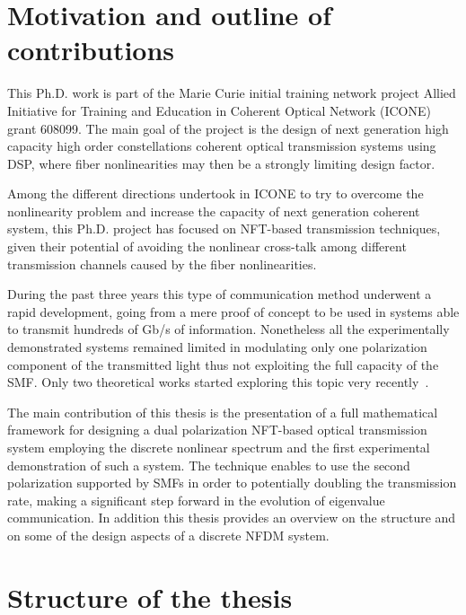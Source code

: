 \section{Motivation and outline of contributions}

This Ph.D. work is part of the Marie Curie initial training network project Allied Initiative for Training and Education in Coherent Optical Network
(ICONE) grant 608099. The main goal of the project is the design of next generation high capacity high order
constellations coherent optical transmission systems using \ac{DSP}, where fiber
nonlinearities may then be a strongly limiting design factor.

Among the different directions undertook in ICONE to try to overcome the nonlinearity problem and increase the capacity of next generation coherent system, this Ph.D. project has focused on \ac{NFT}-based transmission techniques,
given their potential of avoiding the nonlinear cross-talk among different transmission channels caused by the fiber nonlinearities.

During the past three years this type of communication method underwent a rapid development, going from a mere proof of concept to be used in systems able to transmit hundreds of \si{Gb/s} of information. Nonetheless all the experimentally demonstrated systems remained limited in modulating only one polarization component of the transmitted light thus not exploiting the full capacity of the \ac{SMF}. Only two theoretical works started exploring this topic very recently~\cite{Maruta,Goossens:17}.

The main contribution of this thesis is the presentation of a full mathematical framework for designing a dual polarization \ac{NFT}-based optical transmission system employing the discrete nonlinear spectrum and the first experimental demonstration of such a system.
The technique enables to use the second polarization supported by \acp{SMF} in order to potentially doubling the transmission rate, making a significant step forward in the evolution of eigenvalue communication. In addition this thesis provides an overview on the structure and on some of the design aspects of a discrete \ac{NFDM} system.


\section{Structure of the thesis}

